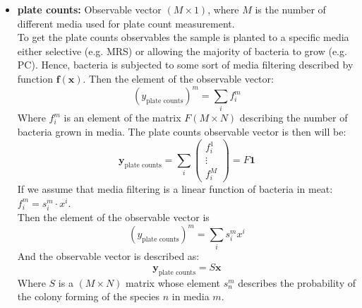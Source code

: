\documentclass[10pt,A4paper]{article}
\begin{document}
\begin{itemize}
    \item \textbf{plate counts:} Observable vector $(M\times1)$, where $M$ is the number of different media used for plate count measurement.\\
    To get the plate counts observables the sample is planted to a specific media either selective (e.g. MRS) or allowing the majority of bacteria to grow (e.g. PC).
    Hence, bacteria is subjected to some sort of media filtering described by function $\mathbf{f}(\mathbf{x})$. 
    Then the element of the observable vector:
    \begin{equation}
        (y_\text{plate counts})^m = \sum_i f^m_i
    \end{equation}
    Where $f^m_i$ is an element of the matrix $F (M \times N)$ describing the number of bacteria grown in media.
    The plate counts observable vector is then will be:
    \begin{equation}
        \mathbf{y}_\text{plate counts} = \sum_i \begin{pmatrix}
            f^1_i \\ \vdots \\ f^M_i
        \end{pmatrix} = F \mathbf{1}
    \end{equation}
    If we assume that media filtering is a linear function of bacteria in meat: $f^m_i=s^m_i \cdot x^i$.\\
    Then the element of the observable vector is
    \begin{equation}
        (y_\text{plate counts})^m = \sum_i s^m_i x^i
    \end{equation}
    And the observable vector is described as:
    \begin{equation}
        \boxed{\mathbf{y}_\text{plate counts} = S \mathbf{x}}
    \end{equation}
    Where $S$ is a $(M \times N)$ matrix whose element $s^m_n$ describes the probability of the colony forming of the species $n$ in media $m$.


\end{itemize}
\end{document}
